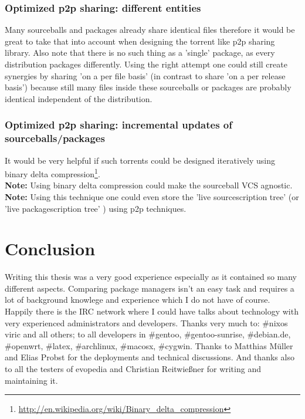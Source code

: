 \documentclass[a4paper,10pt]{article}
\begin{document}
\subsubsection*{Optimized p2p sharing: different entities}
Many sourceballs and packages already share identical files therefore it would be great to take that into account when designing the torrent like p2p sharing library. Also note that there is no such thing as a 'single' package, as every distribution packages differently. Using the right attempt one could still create synergies by sharing 'on a per file basis' (in contrast to share 'on a per release basis') because still many files inside these sourceballs or packages are probably identical independent of the distribution.

\subsubsection*{Optimized p2p sharing: incremental updates of sourceballs/packages}
It would be very helpful if such torrents could be designed iteratively using binary delta compression\footnote{\url{http://en.wikipedia.org/wiki/Binary_delta_compression}}.\\

\textbf{Note:} Using binary delta compression could make the sourceball VCS agnostic.\\

\textbf{Note:} Using this technique one could even store the 'live sourcescription tree' (or 'live packagescription tree' ) using p2p techniques.



\newpage
\section{Conclusion}
Writing this thesis was a very good experience especially as it contained so many different aspects. Comparing package managers isn't an easy task and requires a lot of background knowlege and experience which I do not have of course. Happily there is the IRC network where I could have talks about technology with very experienced administrators and developers. Thanks very much to: \#nixos viric and all others; to all developers in \#gentoo, \#gentoo-sunrise, \#debian.de, \#openwrt, \#latex, \#archlinux, \#macosx, \#cygwin. Thanks to Matthias M\"uller and Elias Probst for the deployments and technical discussions. And thanks also to all the testers of evopedia and Christian Reitwie\ss ner for writing and maintaining it.
\end{document}
